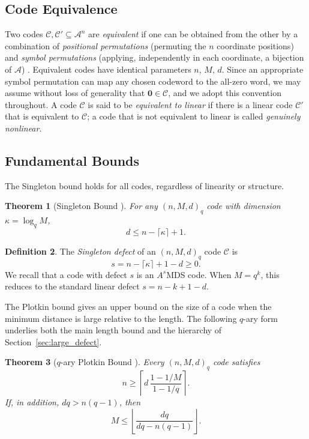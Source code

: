 \documentclass[12pt, letterpaper]{article}
\theoremstyle{plain}
\newtheorem{theorem}{Theorem}[section]
\theoremstyle{definition}
\newtheorem{definition}[theorem]{Definition}
\newcommand{\A}{{\mathcal{A}}}
\newcommand{\mc}[1]{\mathcal{#1}}
\begin{document}
	\subsection{Code Equivalence}

	Two codes $\mathcal{C}, \mathcal{C}' \subseteq \A^n$ are \emph{equivalent} if one can be obtained from the other by a combination of \emph{positional permutations} (permuting the $n$ coordinate positions) and \emph{symbol permutations} (applying, independently in each coordinate, a bijection of $\A$) \cite{Welsh1988}. Equivalent codes have identical parameters $n$, $M$, $d$. Since an appropriate symbol permutation can map any chosen codeword to the all-zero word, we may assume without loss of generality that $\mathbf{0} \in \mathcal{C}$, and we adopt this convention throughout. A code $\mc{C}$ is said to be \textit{equivalent to linear} if there is a linear code $\mc{C}'$ that is equivalent to $\mc{C}$; a code that is not equivalent to linear is called \emph{genuinely nonlinear}.
	
	\subsection{Fundamental Bounds}
	
	The Singleton bound holds for all codes, regardless of linearity or structure.
	
	\begin{theorem}[Singleton Bound \cite{Singleton1964, MacWilliamsSloane1977}]
		For any $(n, M, d)_q$ code with dimension $\kappa = \log_q M$,
		\[
		d \le n - \lceil \kappa \rceil + 1.
		\]
	\end{theorem}
	
	\begin{definition}
		The \emph{Singleton defect} of an $(n, M, d)_q$ code $\mathcal{C}$ is
		\[
		s = n - \lceil \kappa \rceil + 1 - d \ge 0.
		\]
		We recall that a code with defect $  s  $ is an $A^s$MDS code. When $  M=q^k  $, this reduces to the standard linear defect $  s=n-k+1-d  $.
	\end{definition}

	The Plotkin bound gives an upper bound on the size of a code when the minimum distance is large relative to the length. The following $q$-ary form underlies both the main length bound and the hierarchy of Section~\ref{sec:large_defect}.
	
	\begin{theorem}[$q$-ary Plotkin Bound \cite{Plotkin1960,SilvermanMetrization1960,MR238597}]
		\label{thm:plotkin_qary}
		Every $(n,M,d)_q$ code satisfies
		\begin{equation}\label{eq:plotkin_length}
		 n\ge \left\lceil d\,\frac{1-1/M}{1-1/q}\right\rceil.
		\end{equation}
		If, in addition, $dq>n(q-1)$, then
		\[
		 M\le \left\lfloor\frac{dq}{dq-n(q-1)}\right\rfloor.
		\]
	\end{theorem}
	
\end{document}

